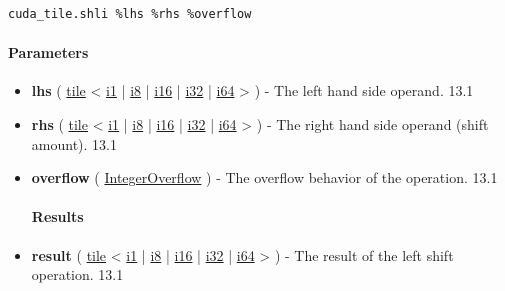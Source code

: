 \documentclass{article}
\begin{document}
\begin{lstlisting}
cuda_tile.shli %lhs %rhs %overflow
\end{lstlisting}

\paragraph{Parameters}

\begin{itemize}
\item \textbf{lhs} ( \href{https://docs.nvidia.com/cuda/tile-ir/latest/sections/types.html#type-tile}{tile} < \href{https://docs.nvidia.com/cuda/tile-ir/latest/sections/types.html#subsection-element-types}{i1} | \href{https://docs.nvidia.com/cuda/tile-ir/latest/sections/types.html#subsection-element-types}{i8} | \href{https://docs.nvidia.com/cuda/tile-ir/latest/sections/types.html#subsection-element-types}{i16} | \href{https://docs.nvidia.com/cuda/tile-ir/latest/sections/types.html#subsection-element-types}{i32} | \href{https://docs.nvidia.com/cuda/tile-ir/latest/sections/types.html#subsection-element-types}{i64} > ) - The left hand side operand. 13.1
\item \textbf{rhs} ( \href{https://docs.nvidia.com/cuda/tile-ir/latest/sections/types.html#type-tile}{tile} < \href{https://docs.nvidia.com/cuda/tile-ir/latest/sections/types.html#subsection-element-types}{i1} | \href{https://docs.nvidia.com/cuda/tile-ir/latest/sections/types.html#subsection-element-types}{i8} | \href{https://docs.nvidia.com/cuda/tile-ir/latest/sections/types.html#subsection-element-types}{i16} | \href{https://docs.nvidia.com/cuda/tile-ir/latest/sections/types.html#subsection-element-types}{i32} | \href{https://docs.nvidia.com/cuda/tile-ir/latest/sections/types.html#subsection-element-types}{i64} > ) - The right hand side operand (shift amount). 13.1
\item \textbf{overflow} ( \href{https://docs.nvidia.com/cuda/tile-ir/latest/sections/operations.html#op-attribute-cuda-tile-shli-integeroverflow-attr}{IntegerOverflow} ) - The overflow behavior of the operation. 13.1


\paragraph{Results}

\item \textbf{result} ( \href{https://docs.nvidia.com/cuda/tile-ir/latest/sections/types.html#type-tile}{tile} < \href{https://docs.nvidia.com/cuda/tile-ir/latest/sections/types.html#subsection-element-types}{i1} | \href{https://docs.nvidia.com/cuda/tile-ir/latest/sections/types.html#subsection-element-types}{i8} | \href{https://docs.nvidia.com/cuda/tile-ir/latest/sections/types.html#subsection-element-types}{i16} | \href{https://docs.nvidia.com/cuda/tile-ir/latest/sections/types.html#subsection-element-types}{i32} | \href{https://docs.nvidia.com/cuda/tile-ir/latest/sections/types.html#subsection-element-types}{i64} > ) - The result of the left shift operation. 13.1



\end{itemize}
\end{document}
